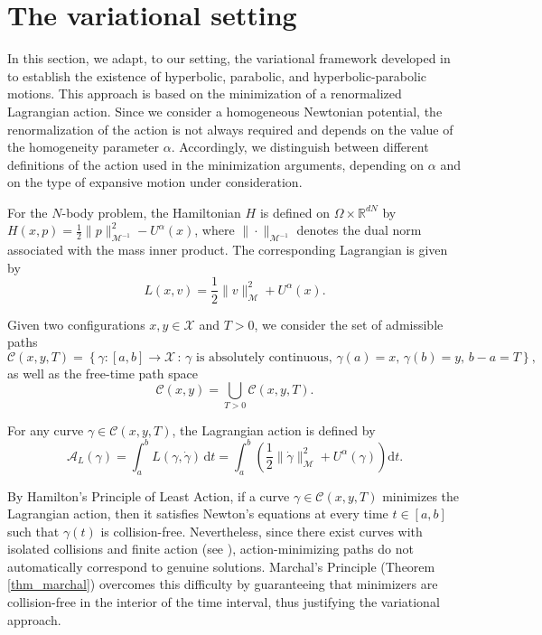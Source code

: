 \documentclass[a4paper,10pt]{amsart}
\theoremstyle{plain}
\theoremstyle{definition}
\numberwithin{equation}{section}
\numberwithin{thm}{section}
\begin{document}


\section{The variational setting}\label{sec:variational_setting}

In this section, we adapt, to our setting, the variational framework developed in \cite{PolimeniTerracini} to establish the existence of hyperbolic, parabolic, and hyperbolic-parabolic motions. This approach is based on the minimization of a renormalized Lagrangian action. Since we consider a homogeneous Newtonian potential, the renormalization of the action is not always required and depends on the value of the homogeneity parameter $\alpha$. Accordingly, we distinguish between different definitions of the action used in the minimization arguments, depending on $\alpha$ and on the type of expansive motion under consideration.

For the $N$-body problem, the Hamiltonian $H$ is defined on $\Omega \times \mathbb{R}^{dN}$ by $H(x, p) = \frac{1}{2} \|p\|_{\mathcal{M}^{-1}}^2 - U^\alpha(x)$, where $\|\cdot\|_{\mathcal{M}^{-1}}$ denotes the dual norm associated with the mass inner product. The corresponding Lagrangian is given by
\begin{equation}\label{eq:lagrangian}
    L(x, v) = \frac{1}{2} \|v\|_\mathcal{M}^2 + U^\alpha(x).
\end{equation}

Given two configurations $x, y \in \mathcal{X}$ and $T > 0$, we consider the set of admissible paths
\[
\mathcal{C}(x, y, T) = \left\{ \gamma : [a, b] \rightarrow \mathcal{X} \,:\, \gamma \text{ is absolutely continuous},\, \gamma(a) = x,\, \gamma(b) = y,\, b - a = T \right\},
\]
as well as the free-time path space
\[
\mathcal{C}(x, y) = \bigcup_{T > 0} \mathcal{C}(x, y, T).
\]

For any curve $\gamma \in \mathcal{C}(x, y, T)$, the Lagrangian action is defined by
\[
    \mathcal{A}_L(\gamma) = \int_{a}^{b} L(\gamma, \dot{\gamma})\, \mathrm{d}t 
    = \int_{a}^{b} \left( \frac{1}{2} \|\dot{\gamma}\|_\mathcal{M}^2 + U^\alpha(\gamma) \right) \mathrm{d}t.
\]

By Hamilton's Principle of Least Action, if a curve $\gamma \in \mathcal{C}(x, y, T)$ minimizes the Lagrangian action, then it satisfies Newton's equations at every time $t \in [a, b]$ such that $\gamma(t)$ is collision-free. Nevertheless, since there exist curves with isolated collisions and finite action (see \cite{Poincare_SolutionsPeriodiques}), action-minimizing paths do not automatically correspond to genuine solutions. Marchal's Principle (Theorem \ref{thm_marchal}) overcomes this difficulty by guaranteeing that minimizers are collision-free in the interior of the time interval, thus justifying the variational approach.
\end{document}
